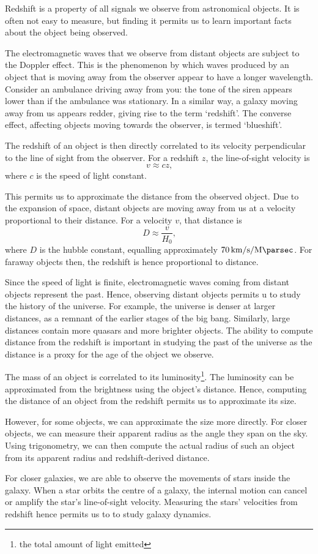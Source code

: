 \documentclass{article}
\begin{document}
Redshift is a property of all signals we observe from astronomical objects. It is often not easy to measure, but finding it permits us to learn important facts about the object being observed.

The electromagnetic waves that we observe from distant objects are subject to the Doppler effect. This is the phenomenon by which waves produced by an object that is moving away from the observer appear to have a longer wavelength. Consider an ambulance driving away from you: the tone of the siren appears lower than if the ambulance was stationary. In a similar way, a galaxy moving away from us appears redder, giving rise to the term `redshift'. The converse effect, affecting objects moving towards the observer, is termed `blueshift'.

The redshift of an object is then directly correlated to its velocity perpendicular to the line of sight from the observer. For a redshift $z$, the line-of-sight velocity is\[
    v \approx cz \text{,}
\] where $c$ is the speed of light constant.

This permits us to approximate the distance from the observed object. Due to the expansion of space, distant objects are moving away from us at a velocity proportional to their distance. For a velocity $v$, that distance is \[
    D \approx \frac{v}{H_0} \text{,}
\] where $D$ is the hubble constant, equalling approximately $\SI{70}{\kilo\meter\per\second\per\mega\parsec}$. For faraway objects then, the redshift is hence proportional to distance.

Since the speed of light is finite, electromagnetic waves coming from distant objects represent the past. Hence, observing distant objects permits u to study the history of the universe. For example, the universe is denser at larger distances, as a remnant of the earlier stages of the big bang. Similarly, large distances contain more quasars and more brighter objects. The ability to compute distance from the redshift is important in studying the past of the universe as the distance is a proxy for the age of the object we observe.

The mass of an object is correlated to its luminosity\footnote{the total amount of light emitted}. The luminosity can be approximated from the brightness using the object's distance. Hence, computing the distance of an object from the redshift permits us to approximate its size.

However, for some objects, we can approximate the size more directly. For closer objects, we can measure their apparent radius as the angle they span on the sky. Using trigonometry, we can then compute the actual radius of such an object from its apparent radius and redshift-derived distance.

For closer galaxies, we are able to observe the movements of stars inside the galaxy. When a star orbits the centre of a galaxy, the internal motion can cancel or amplify the star's line-of-sight velocity. Measuring the stars' velocities from redshift hence permits us to to study galaxy dynamics.
\end{document}
